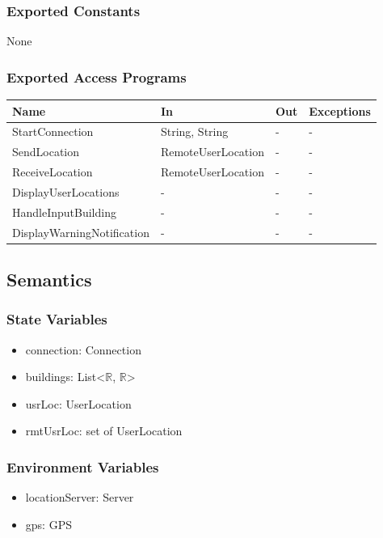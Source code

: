 \documentclass[12pt, titlepage]{article}
\begin{document}
\subsubsection{Exported Constants}

None

\subsubsection{Exported Access Programs}

\begin{center}
\begin{tabular}{p{4cm} p{4cm} p{3cm} p{3cm}}
\hline
\textbf{Name} & \textbf{In} & \textbf{Out} & \textbf{Exceptions} \\
\hline
StartConnection & String, String & - & - \\
SendLocation & RemoteUserLocation & - & - \\
ReceiveLocation & RemoteUserLocation & - & - \\
DisplayUserLocations & - & - & - \\
HandleInputBuilding & - & - & - \\
DisplayWarningNotification & - & - & - \\

\hline
\end{tabular}
\end{center}

\subsection{Semantics}

\subsubsection{State Variables}

\begin{itemize}
\item connection: Connection
\item buildings: List\textless\textlangle $\mathbb{R}$, $\mathbb{R}$\textrangle\textgreater 
\item usrLoc: UserLocation
\item rmtUsrLoc: set of UserLocation
\end{itemize}

\subsubsection{Environment Variables}
\begin{itemize}
\item locationServer: Server
\item gps: GPS
\end{itemize}
\end{document}
